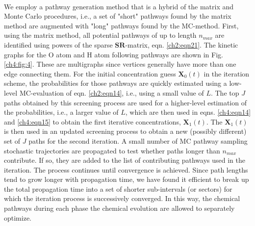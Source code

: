 \paragraph{}
We employ a pathway generation method that is a hybrid of
the matrix and Monte Carlo procedures, i.e., a set of "short"
pathways found by the matrix method are augmented with
"long" pathways found by the MC-method. First, using the
matrix method, all potential pathways of up to length $n_{max}$ are
identified using powers of the sparse $\mathbf{SR}$-matrix, eqn. \ref{ch2:eqn21}. The
kinetic graphs for the O atom and H atom following pathways
are shown in Fig. \ref{ch4:fig:4}. These are multigraphs since vertices
generally have more than one edge connecting them. For the
initial concentration guess ${\mathbf{X}}_0(t)$ in the iteration scheme, the
probabilities for those pathways are quickly estimated using a
low-level MC-evaluation of eqn. \ref{ch2:eqn14}, i.e., using a small value of $L$.
The top $J$ paths obtained by this screening process are used for
a higher-level estimation of the probabilities, i.e., a larger value
of $L$, which are then used in eqns. \ref{ch4:eqn14} and \ref{ch4:eqn15} to obtain the first
iterative concentrations, ${\mathbf{X}}_1(t)$. The ${\mathbf{X}}_1(t)$ is then used in an
updated screening process to obtain a new (possibly different)
set of $J$ paths for the second iteration. A small number of MC pathway
sampling stochastic trajectories are propagated to test whether paths longer than $n_{max}$ contribute. If so, they are added
to the list of contributing pathways used in the iteration. The
process continues until convergence is achieved. Since path
lengths tend to grow longer with propagation time, we have
found it efficient to break up the total propagation time into a
set of shorter sub-intervals (or sectors) for which the iteration
process is successively converged. In this way, the chemical
pathways during each phase the chemical evolution are allowed
to separately optimize.
